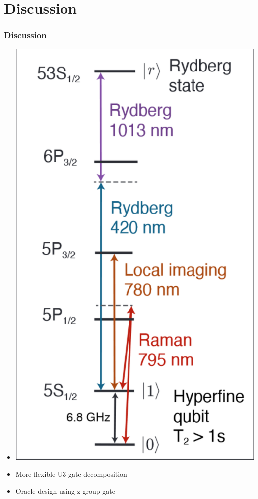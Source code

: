 \documentclass[18 pt]{beamer}
\begin{document}
\section{Discussion}
\begin{frame}
    \frametitle{Discussion}
    \begin{itemize}
        \item \includegraphics[width=\textwidth]{level.png}
        \item More flexible U3 gate decomposition
        \item Oracle design using z group gate
    \end{itemize}
\end{frame}
\end{document}
